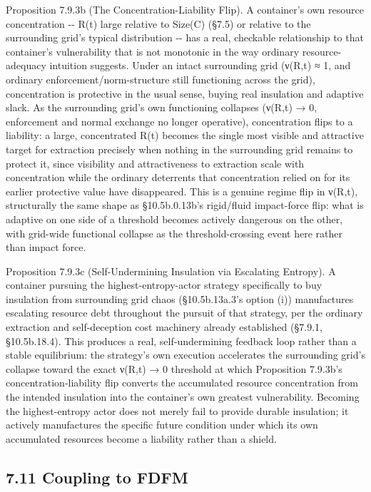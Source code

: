 \documentclass[
]{article}
\begin{document}
Proposition 7.9.3b (The Concentration-Liability Flip). A container's own
resource concentration -\/- R(t) large relative to Size(C) (§7.5) or
relative to the surrounding grid's typical distribution -\/- has a real,
checkable relationship to that container's vulnerability that is not
monotonic in the way ordinary resource-adequacy intuition suggests.
Under an intact surrounding grid (ν(R,t) ≈ 1, and ordinary
enforcement/norm-structure still functioning across the grid),
concentration is protective in the usual sense, buying real insulation
and adaptive slack. As the surrounding grid's own functioning collapses
(ν(R,t) → 0, enforcement and normal exchange no longer operative),
concentration flips to a liability: a large, concentrated R(t) becomes
the single most visible and attractive target for extraction precisely
when nothing in the surrounding grid remains to protect it, since
visibility and attractiveness to extraction scale with concentration
while the ordinary deterrents that concentration relied on for its
earlier protective value have disappeared. This is a genuine regime flip
in ν(R,t), structurally the same shape as §10.5b.0.13b's rigid/fluid
impact-force flip: what is adaptive on one side of a threshold becomes
actively dangerous on the other, with grid-wide functional collapse as
the threshold-crossing event here rather than impact force.

Proposition 7.9.3c (Self-Undermining Insulation via Escalating Entropy).
A container pursuing the highest-entropy-actor strategy specifically to
buy insulation from surrounding grid chaos (§10.5b.13a.3's option (i))
manufactures escalating resource debt throughout the pursuit of that
strategy, per the ordinary extraction and self-deception cost machinery
already established (§7.9.1, §10.5b.18.4). This produces a real,
self-undermining feedback loop rather than a stable equilibrium: the
strategy's own execution accelerates the surrounding grid's collapse
toward the exact ν(R,t) → 0 threshold at which Proposition 7.9.3b's
concentration-liability flip converts the accumulated resource
concentration from the intended insulation into the container's own
greatest vulnerability. Becoming the highest-entropy actor does not
merely fail to provide durable insulation; it actively manufactures the
specific future condition under which its own accumulated resources
become a liability rather than a shield.

\hypertarget{coupling-to-fdfm}{%
\subsection{7.11 Coupling to FDFM}\label{coupling-to-fdfm}}
\end{document}
